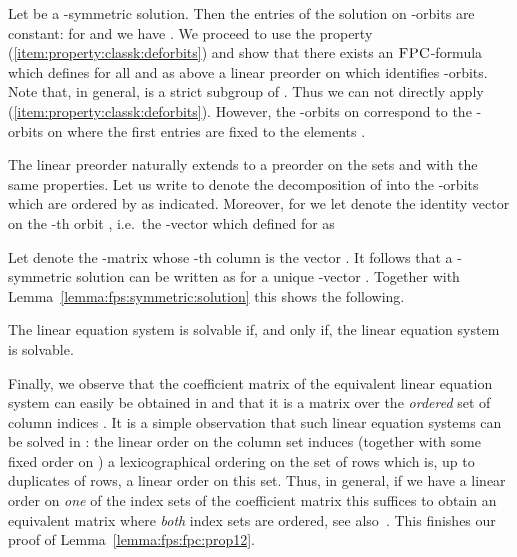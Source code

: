 \documentclass[a4paper,UKenglish]{lipics}
\newcommand{\logic}[1]{\ensuremath{\textsc{#1}}\xspace}
\newcommand{\FPC}{\logic{FPC}}
\theoremstyle{plain}
\begin{document}
Let  be a -symmetric solution. Then the 
entries of the solution  on -orbits are constant: for  
and  we have .
We proceed to use the property (\ref{item:property:classk:deforbits}) and 
show that there exists an \FPC-formula   which 
defines for all  and  as above a 
linear preorder  on  which identifies -orbits. 
Note that, in general,  is a strict subgroup of 
. Thus we can not directly apply 
(\ref{item:property:classk:deforbits}).
However, the -orbits on 
 correspond to the -orbits on 
 where the first  entries are fixed to the elements .

The linear preorder  naturally extends to a preorder on the 
sets  and  with the same properties.
Let us write  to denote the 
decomposition of  into the -orbits  which are ordered 
by  as indicated.
Moreover, for  we let  denote the identity vector on the 
-th orbit , i.e.\ the -vector which defined for  as


Let  denote the -matrix whose -th column is the vector 
. It follows that a -symmetric solution  can be written as 
 for a unique -vector .
Together with Lemma~\ref{lemma:fps:symmetric:solution} this shows the following.

\begin{lemma}
 The linear equation system  is solvable if, and only 
if, the linear equation system  is 
solvable.
\end{lemma}

Finally, we observe that the coefficient matrix  of the equivalent linear equation system  can easily be obtained in  and that it is a matrix over the 
\emph{ordered} set of column indices . 
It is a simple observation that such linear equation systems can be solved 
in : the linear order on the column set induces 
(together with some fixed order on ) a lexicographical 
ordering on the set of rows which is, up to duplicates of rows, a 
linear order on this set. Thus, in general, if we have a linear order on 
\emph{one} of the index sets of the coefficient matrix this suffices to 
obtain an equivalent matrix where \emph{both} index sets are ordered, see 
also~\cite{Pa10}.
This finishes our proof of Lemma~\ref{lemma:fps:fpc:prop12}.
\end{document}
